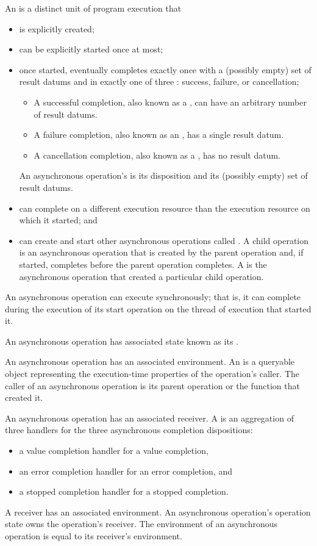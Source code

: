 \pnum
An  is
a distinct unit of program execution that
\begin{itemize}
\item
is explicitly created;
\item
can be explicitly started once at most;
\item
once started, eventually completes exactly once
with a (possibly empty) set of result datums and
in exactly one of three :
success, failure, or cancellation;
\begin{itemize}
\item
A successful completion, also known as a ,
can have an arbitrary number of result datums.
\item
A failure completion, also known as an ,
has a single result datum.
\item
A cancellation completion, also known as a ,
has no result datum.
\end{itemize}
An asynchronous operation's 
is its disposition and its (possibly empty) set of result datums.
\item
can complete on a different execution resource
than the execution resource on which it started; and
\item
can create and start other asynchronous operations
called .
A child operation is an asynchronous operation
that is created by the parent operation and,
if started, completes before the parent operation completes.
A  is the asynchronous operation
that created a particular child operation.
\end{itemize}
\begin{note}
An asynchronous operation can execute synchronously;
that is, it can complete during the execution of its start operation
on the thread of execution that started it.
\end{note}

\pnum
An asynchronous operation has associated state
known as its .

\pnum
An asynchronous operation has an associated environment.
An  is a queryable object
representing the execution-time properties of the operation's caller.
The caller of an asynchronous operation is
its parent operation or the function that created it.

\pnum
An asynchronous operation has an associated receiver.
A  is an aggregation of three handlers
for the three asynchronous completion dispositions:
\begin{itemize}
\item a value completion handler for a value completion,
\item an error completion handler for an error completion, and
\item a stopped completion handler for a stopped completion.
\end{itemize}
A receiver has an associated environment.
An asynchronous operation's operation state owns the operation's receiver.
The environment of an asynchronous operation
is equal to its receiver's environment.


